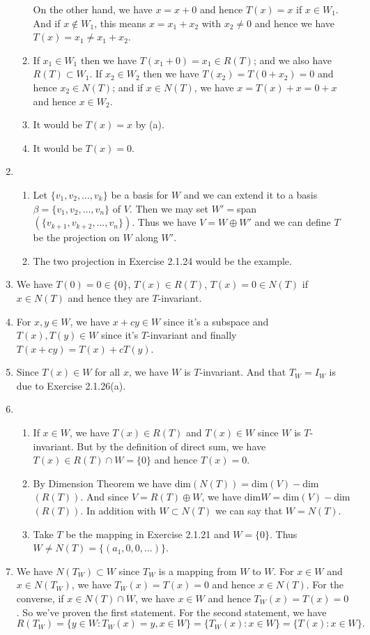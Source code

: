 \begin{enumerate}
\begin{enumerate}
On the other hand, we have $x=x+0$ and hence $T(x)=x$ if $x\in W_1$. And if $x\notin W_1$, this means $x=x_1+x_2$ with $x_2\neq 0$ and hence we have $T(x)=x_1\neq x_1+x_2$.
\item If $x_1\in W_1$ then we have $T(x_1+0)=x_1\in R(T)$; and we also have $R(T)\subset W_1$. If $x_2\in W_2$ then we have $T(x_2)=T(0+x_2)=0$ and hence $x_2\in N(T)$; and if $x\in N(T)$, we have $x=T(x)+x=0+x$ and hence $x\in W_2$.
\item It would be $T(x)=x$ by (a).
\item It would be $T(x)=0$.
\end{enumerate}
\item \begin{enumerate}
\item Let $\{v_1,v_2,\ldots ,v_k\}$ be a basis for $W$ and we can extend it to a basis $\beta =\{v_1,v_2,\ldots ,v_n\}$ of $V$. Then we may set $W'=$span$(\{v_{k+1}, v_{k+2},\ldots ,v_n\})$. Thus we have $V=W\oplus W'$ and we can define $T$ be the projection on $W$ along $W'$.
\item The two projection in Exercise 2.1.24 would be the example.
\end{enumerate}
\item We have $T(0)=0\in \{0\}$, $T(x)\in R(T)$, $T(x)=0 \in N(T)$ if $x\in N(T)$ and hence they are $T$-invariant.
\item For $x,y\in W$, we have $x+cy\in W$ since it's a subspace and $T(x),T(y)\in W$ since it's $T$-invariant and finally $T(x+cy)=T(x)+cT(y)$.
\item Since $T(x)\in W$ for all $x$, we have $W$ is $T$-invariant. And that $T_W=I_W$ is due to Exercise 2.1.26(a).
\item \begin{enumerate}
\item If $x\in W$, we have $T(x)\in R(T)$ and $T(x)\in W$ since $W$ is $T$-invariant. But by the definition of direct sum, we have $T(x)\in R(T)\cap W=\{0\}$ and hence $T(x)=0$.
\item By Dimension Theorem we have dim$(N(T))=$dim$(V)-$dim$(R(T))$. And since $V=R(T)\oplus W$, we have dim$W=$dim$(V)-$dim$(R(T))$. In addition with $W\subset N(T)$ we can say that $W=N(T)$.
\item Take $T$ be the mapping in Exercise 2.1.21 and $W=\{0\}$. Thus $W\neq N(T)=\{(a_1,0,0,\ldots )\}$.
\end{enumerate}
\item We have $N(T_W)\subset W$ since $T_W$ is a mapping from $W$ to $W$. For $x\in W$ and $x\in N(T_W)$, we have $T_W(x)=T(x)=0$ and hence $x\in N(T)$. For the converse, if $x\in N(T)\cap W$, we have $x\in W$ and hence $T_W(x)=T(x)=0$. So we've proven the first statement. For the second statement, we have \[R(T_W)=\{y\in W:T_W(x)=y,x\in W\}=\{T_W(x):x\in W\}=\{T(x):x\in W\}.\]

\end{enumerate}
